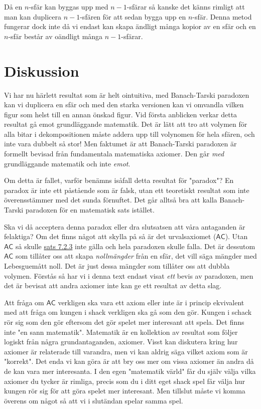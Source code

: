 \documentclass{article}
\theoremstyle{definition}
\begin{document}
Då en $n$-sfär kan byggas upp med $n-1$-sfärar så kanske det känns rimligt att man kan duplicera $n-1$-sfären för att sedan bygga upp en $n$-sfär.
Denna metod fungerar dock inte då vi endast kan skapa ändligt många kopior av en sfär och en $n$-sfär består av oändligt många $n-1$-sfärar. 

\section{Diskussion}
Vi har nu härlett resultat som är helt ointuitiva, med Banach-Tarski paradoxen kan vi duplicera en sfär och 
med den starka versionen kan vi omvandla vilken figur som helst till en annan önskad figur. Vid första anblicken verkar detta resultat 
gå emot grundläggande matematik. Det är lätt att tro att volymen för alla bitar i dekompositionen måste addera upp till volynomen för hela 
sfären, och inte vara dubbelt så stor! Men faktumet är att Banach-Tarski paradoxen är formellt bevisad från fundamentala matematiska 
axiomer. Den går \textit{med} grundläggande matematik och inte \textit{emot}.

Om detta är fallet, varför benämns isåfall detta resultat för "paradox"? En paradox är inte ett påstående som är falsk, utan ett teoretiskt resultat 
som inte överensstämmer med det sunda förnuftet. Det går alltså bra att kalla Banach-Tarski paradoxen för en matematisk sats istället. 

Ska vi då acceptera denna paradox eller dra slutsatsen att våra antaganden är felaktiga? 
Om det finns något att skylla på så är det urvalsaxiomet ($\mathsf{AC}$). Utan $\mathsf{AC}$ så skulle \hyperlink{sats8.3.2}{sats 7.2.3}
inte gälla och hela paradoxen skulle falla. Det är dessutom $\mathsf{AC}$ som tillåter oss att skapa \textit{nollmängder} från en sfär, 
det vill säga mängder med Lebesguemått noll. Det är just dessa mängder som tillåter oss att dubbla volymen. 
Förstås så har vi i denna text endast visat \textit{ett} bevis av paradoxen, men det 
är bevisat att andra axiomer inte kan ge ett resultat av detta slag. 

Att fråga om $\mathsf{AC}$ verkligen ska vara ett axiom eller inte är i princip ekvivalent med att fråga om kungen i shack 
verkligen ska gå som den gör. Kungen i schack rör sig som den gör eftersom det gör spelet mer interesant att spela.
Det finns inte "en sann matematik". Matematik är en kollektion av resultat som följer logiskt från några grundantaganden, axiomer. 
Visst kan diskutera kring hur axiomer är relaterade till varandra, men vi kan aldrig säga vilket axiom som är "korrekt". 
Det enda vi kan göra är att bry oss mer om vissa axiomer än andra då de kan vara mer interesanta. 
I den egen "matematik värld" får du själv välja vilka axiomer du tycker är rimliga, precis som 
du i ditt eget shack spel får välja hur kungen rör sig för att göra spelet mer interesant. Men tillslut måste vi komma överens 
om något så att vi i slutändan spelar samma spel.
\end{document}
